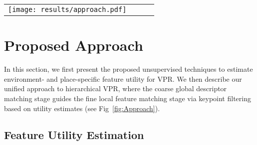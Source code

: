 \documentclass[letterpaper, 10 pt, conference]{ieeeconf}  \fi
\begin{document}
\begin{figure*}
\centering
\begin{tabular}{cccc}
\texttt{[image: results/approach.pdf]} \\
\end{tabular}
\caption{Schematic of our proposed approach. In the offline stage, global and local descriptors are extracted from the reference database images, and environment-specific (ES) and place-specific (PS) utility is estimated to further filter the local keypoints. During the online localization stage, for a given query, the top C matching candidates are retrieved from the reference database using global descriptor matching. The final place match is then obtained through local feature matching of query image features with the high utility features of the candidates.}
\label{fig:Approach}
\end{figure*}

\section{Proposed Approach}
In this section, we first present the proposed unsupervised techniques to estimate environment- and place-specific feature utility for VPR. We then describe our unified approach to hierarchical VPR, where the coarse global descriptor matching stage guides the fine local feature matching stage via keypoint filtering based on utility estimates (see Fig~\ref{fig:Approach}).

\subsection{Feature Utility Estimation}
\end{document}
